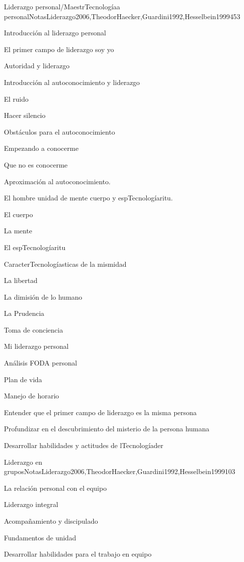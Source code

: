\begin{syllabus}
\begin{unit}{Liderazgo personal/MaestrTecnologíaa personal}{NotasLiderazgo2006,TheodorHaecker,Guardini1992,Hesselbein1999}{45}{3}
\begin{topics}
	\item Introducción al liderazgo personal
	\item El primer campo de liderazgo soy yo
	\item Autoridad y liderazgo
	\item Introducción al autoconocimiento y liderazgo
	\item El ruido
	\item Hacer silencio
	\item Obstáculos para el autoconocimiento
	\item Empezando a conocerme
	\item Que no es conocerme
	\item Aproximación al autoconocimiento.
	\item El hombre unidad de mente cuerpo y espTecnologíaritu.
	\item El cuerpo
	\item La mente
	\item El espTecnologíaritu
	\item CaracterTecnologíasticas de la mismidad
	\item La libertad
	\item La dimisión de lo humano
	\item La Prudencia
	\item Toma de conciencia
	\item Mi liderazgo personal
	\item Análisis FODA personal
	\item Plan de vida
	\item Manejo de horario
\end{topics}
\begin{unitgoals}
	\item Entender que el primer campo de liderazgo es la misma persona
	\item Profundizar en el descubrimiento del misterio de la persona humana
	\item Desarrollar habilidades y actitudes de lTecnologíader
\end{unitgoals}
\end{unit}

\begin{unit}{Liderazgo en grupos}{NotasLiderazgo2006,TheodorHaecker,Guardini1992,Hesselbein1999}{10}{3}
\begin{topics}
	\item La relación personal con el equipo
	\item Liderazgo integral
	\item Acompañamiento y discipulado
	\item Fundamentos de unidad
\end{topics}
\begin{unitgoals}
	\item Desarrollar habilidades para el trabajo en equipo
\end{unitgoals}
\end{unit}




\end{syllabus}
